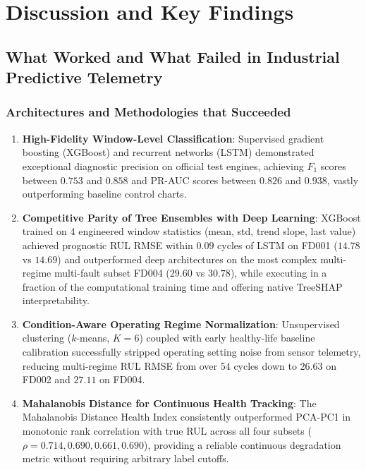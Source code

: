 \section{Discussion and Key Findings}
\label{sec:discussion}

\subsection{What Worked and What Failed in Industrial Predictive Telemetry}

\subsubsection{Architectures and Methodologies that Succeeded}
\begin{enumerate}
    \item \textbf{High-Fidelity Window-Level Classification}: Supervised gradient boosting (XGBoost) and recurrent networks (LSTM) demonstrated exceptional diagnostic precision on official test engines, achieving $F_1$ scores between $0.753$ and $0.858$ and PR-AUC scores between $0.826$ and $0.938$, vastly outperforming baseline control charts.
    \item \textbf{Competitive Parity of Tree Ensembles with Deep Learning}: XGBoost trained on 4 engineered window statistics (mean, std, trend slope, last value) achieved prognostic RUL RMSE within $0.09$ cycles of LSTM on FD001 ($14.78$ vs $14.69$) and outperformed deep architectures on the most complex multi-regime multi-fault subset FD004 ($29.60$ vs $30.78$), while executing in a fraction of the computational training time and offering native TreeSHAP interpretability.
    \item \textbf{Condition-Aware Operating Regime Normalization}: Unsupervised clustering ($k$-means, $K=6$) coupled with early healthy-life baseline calibration successfully stripped operating setting noise from sensor telemetry, reducing multi-regime RUL RMSE from over $54$ cycles down to $26.63$ on FD002 and $27.11$ on FD004.
    \item \textbf{Mahalanobis Distance for Continuous Health Tracking}: The Mahalanobis Distance Health Index consistently outperformed PCA-PC1 in monotonic rank correlation with true RUL across all four subsets ($\rho = 0.714, 0.690, 0.661, 0.690$), providing a reliable continuous degradation metric without requiring arbitrary label cutoffs.
\end{enumerate}

